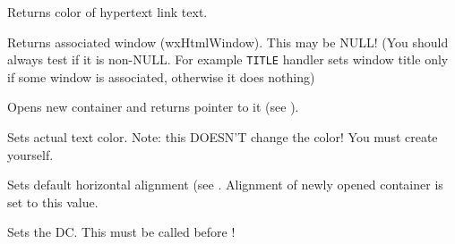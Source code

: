 
Returns color of hypertext link text.

\label{wxhtmlwinparsergetwindow}


Returns associated window (wxHtmlWindow). This may be NULL! (You should always
test if it is non-NULL. For example {\tt TITLE} handler sets window
title only if some window is associated, otherwise it does nothing)


\label{wxhtmlwinparseropencontainer}


Opens new container and returns pointer to it (see ).

%
\label{wxhtmlwinparsersetactualcolor}


Sets actual text color. Note: this DOESN'T change the color! 
You must create  yourself.

\label{wxhtmlwinparsersetalign}


Sets default horizontal alignment (see .
Alignment of newly opened container is set to this value.

%
%
%

\label{wxhtmlwinparsersetdc}


Sets the DC. This must be called before !

\label{wxhtmlwinparsersetfontbold}


